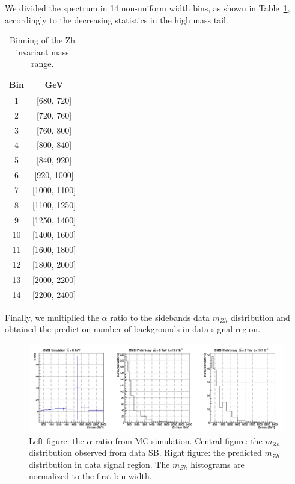 We divided the spectrum in 14 non-uniform width bins, as shown in Table~\ref{tab:bin}, accordingly to the decreasing statistics in the high mass tail.

\begin{center}
  \begin{table}[h]
    \begin{center}
      \begin{tabular}{c|c}
        \hline
        \bf Bin & \bf GeV \\
        \hline
        \hline
        1 & [680, 720] \\
        2 & [720, 760] \\
        3 & [760, 800] \\
        4 & [800, 840] \\
        5 & [840, 920] \\
        6 & [920, 1000] \\
        7 & [1000, 1100] \\
        8 & [1100, 1250] \\
        9 & [1250, 1400] \\
        10 & [1400, 1600] \\
        11 & [1600, 1800] \\
        12 & [1800, 2000] \\
        13 & [2000, 2200] \\
        14 & [2200, 2400] \\
        \hline
      \end{tabular}
    \end{center}
    \caption{\label{tab:bin}Binning of the Zh invariant mass range.}
  \end{table}
\end{center}

Finally, we multiplied the $\alpha$ ratio to the sidebands data $m_{Zh}$ distribution and obtained the prediction number of backgrounds in data signal region.

\begin{figure}[hbtp]
  \begin{center}
    \includegraphics[width=\textwidth]{figure/CH3/alpha_new.png}
  \end{center}
  \caption{\label{fig:alpha}Left figure: the $\alpha$ ratio from MC simulation. Central figure: the $m_{Zh}$ distribution observed from data SB. Right figure: the predicted $m_{Zh}$ distribution in data signal region. The $m_{Zh}$ histograms are normalized to the first bin width.}
\end{figure}

